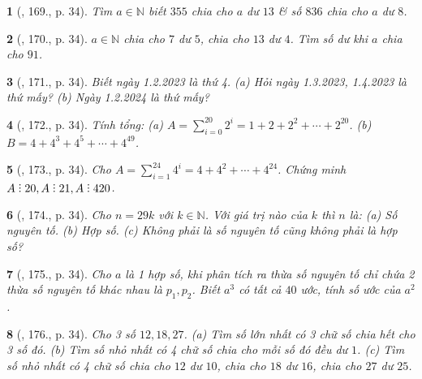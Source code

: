 \documentclass{article}
\newtheorem{baitoan}{}
\DeclareRobustCommand{\divby}{%
	\mathrel{\vbox{\baselineskip.65ex\lineskiplimit0pt\hbox{.}\hbox{.}\hbox{.}}}%
}
\begin{document}
\begin{baitoan}[\cite{Tuyen_Toan_6}, 169., p. 34]
	Tìm $a\in\mathbb{N}$ biết $355$ chia cho $a$ dư $13$ \& số $836$ chia cho $a$ dư $8$.
\end{baitoan}

\begin{baitoan}[\cite{Tuyen_Toan_6}, 170., p. 34]
	$a\in\mathbb{N}$ chia cho $7$ dư $5$, chia cho $13$ dư $4$. Tìm số dư khi $a$ chia cho $91$.
\end{baitoan}

\begin{baitoan}[\cite{Tuyen_Toan_6}, 171., p. 34]
	Biết ngày 1.2.2023 là thứ 4. (a) Hỏi ngày 1.3.2023, 1.4.2023 là thứ mấy? (b) Ngày 1.2.2024 là thứ mấy?
\end{baitoan}

\begin{baitoan}[\cite{Tuyen_Toan_6}, 172., p. 34]
	Tính tổng: (a) $A = \sum_{i=0}^{20} 2^i = 1 + 2 + 2^2 + \cdots + 2^{20}$. (b) $B = 4 + 4^3 + 4^5 + \cdots + 4^{49}$.
\end{baitoan}

\begin{baitoan}[\cite{Tuyen_Toan_6}, 173., p. 34]
	Cho $A = \sum_{i=1}^{24} 4^i = 4 + 4^2 + \cdots + 4^{24}$. Chứng minh $A\divby20,A\divby21,A\divby420$.
\end{baitoan}

\begin{baitoan}[\cite{Tuyen_Toan_6}, 174., p. 34]
	Cho $n = 29k$ với $k\in\mathbb{N}$. Với giá trị nào của $k$ thì $n$ là: (a) Số nguyên tố. (b) Hợp số. (c) Không phải là số nguyên tố cũng không phải là hợp số?
\end{baitoan}

\begin{baitoan}[\cite{Tuyen_Toan_6}, 175., p. 34]
	Cho $a$ là 1 hợp số, khi phân tích ra thừa số nguyên tố chỉ chứa 2 thừa số nguyên tố khác nhau là $p_1,p_2$. Biết $a^3$ có tất cả $40$ ước, tính số ước của $a^2$.
\end{baitoan}

\begin{baitoan}[\cite{Tuyen_Toan_6}, 176., p. 34]
	Cho 3 số $12,18,27$. (a) Tìm số lớn nhất có 3 chữ số chia hết cho 3 số đó. (b) Tìm số nhỏ nhất có 4 chữ số chia cho mỗi số đó đều dư $1$. (c) Tìm số nhỏ nhất có 4 chữ số chia cho $12$ dư $10$, chia cho $18$ dư $16$, chia cho $27$ dư $25$.
\end{baitoan}


\printbibliography[heading=bibintoc]
\end{document}

